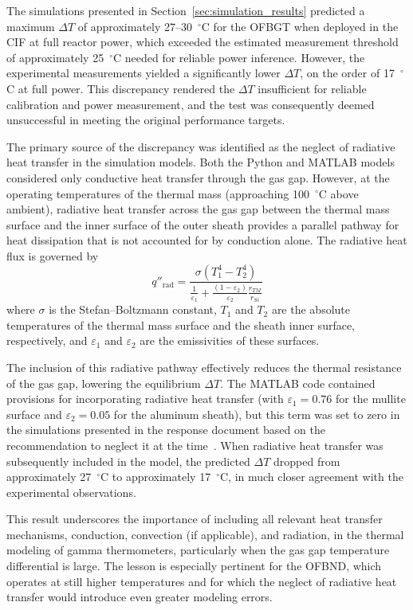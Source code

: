 The simulations presented in Section~\ref{sec:simulation_results} predicted a maximum $\Delta T$ of approximately 27--30~$^\circ$C for the OFBGT when deployed in the CIF at full reactor power, which exceeded the estimated measurement threshold of approximately 25~$^\circ$C needed for reliable power inference.  However, the experimental measurements yielded a significantly lower $\Delta T$, on the order of 17~$^\circ$C at full power.  This discrepancy rendered the $\Delta T$ insufficient for reliable calibration and power measurement, and the test was consequently deemed unsuccessful in meeting the original performance targets.

The primary source of the discrepancy was identified as the neglect of radiative heat transfer in the simulation models.  Both the Python and MATLAB models considered only conductive heat transfer through the gas gap.  However, at the operating temperatures of the thermal mass (approaching 100~$^\circ$C above ambient), radiative heat transfer across the gas gap between the thermal mass surface and the inner surface of the outer sheath provides a parallel pathway for heat dissipation that is not accounted for by conduction alone.  The radiative heat flux is governed by
\begin{equation}
    q''_\mathrm{rad} = \frac{\sigma (T_1^4 - T_2^4)}{\frac{1}{\varepsilon_1} + \frac{(1-\varepsilon_2)}{\varepsilon_2}\frac{r_{TM}}{r_{Si}}}
    \label{eq:radiative}
\end{equation}
where $\sigma$ is the Stefan--Boltzmann constant, $T_1$ and $T_2$ are the absolute temperatures of the thermal mass surface and the sheath inner surface, respectively, and $\varepsilon_1$ and $\varepsilon_2$ are the emissivities of these surfaces.

The inclusion of this radiative pathway effectively reduces the thermal resistance of the gas gap, lowering the equilibrium $\Delta T$.  The MATLAB code contained provisions for incorporating radiative heat transfer (with $\varepsilon_1 = 0.76$ for the mullite surface and $\varepsilon_2 = 0.05$ for the aluminum sheath), but this term was set to zero in the simulations presented in the response document based on the recommendation to neglect it at the time~\cite{SimReport2023}.  When radiative heat transfer was subsequently included in the model, the predicted $\Delta T$ dropped from approximately 27~$^\circ$C to approximately 17~$^\circ$C, in much closer agreement with the experimental observations.

This result underscores the importance of including all relevant heat transfer mechanisms, conduction, convection (if applicable), and radiation, in the thermal modeling of gamma thermometers, particularly when the gas gap temperature differential is large.  The lesson is especially pertinent for the OFBND, which operates at still higher temperatures and for which the neglect of radiative heat transfer would introduce even greater modeling errors.

